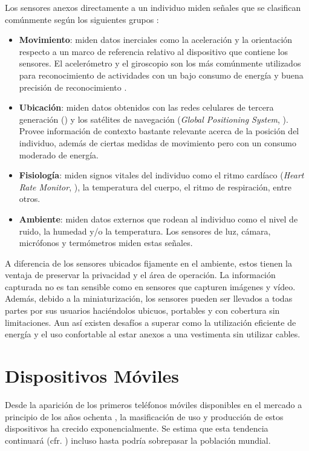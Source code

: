 Los sensores anexos directamente a un individuo miden señales que
se clasifican comúnmente según los siguientes grupos \cite{LaraLabrador2013}:
\begin{itemize}
\item \textbf{Movimiento}: miden datos inerciales como la aceleración y
la orientación respecto a un marco de referencia relativo al dispositivo
que contiene los sensores. El acelerómetro y el giroscopio son los
más comúnmente utilizados para reconocimiento de actividades con un
bajo consumo de energía y buena precisión de reconocimiento \cite{Bao2004,LaraLabrador2012}.
\item \textbf{Ubicación}: miden datos obtenidos con las redes celulares
de tercera generación () y los satélites de navegación (\emph{Global
Positioning System}, ). Provee información de contexto
bastante relevante acerca de la posición del individuo, además de
ciertas medidas de movimiento pero con un consumo moderado de energía.
\item \textbf{Fisiología}: miden signos vitales del individuo como el ritmo
cardíaco (\emph{Heart Rate Monitor},\emph{ }), la temperatura
del cuerpo, el ritmo de respiración, entre otros.
\item \textbf{Ambiente}: miden datos externos que rodean al individuo como
el nivel de ruido, la humedad y/o la temperatura. Los sensores de
luz, cámara, micrófonos y termómetros miden estas señales. 
\end{itemize}
A diferencia de los sensores ubicados fijamente en el ambiente, estos
tienen la ventaja de preservar la privacidad y el área de operación.
La información capturada no es tan sensible como en sensores que capturen
imágenes y vídeo. Además, debido a la miniaturización, los sensores
pueden ser llevados a todas partes por sus usuarios haciéndolos ubicuos,
portables y con cobertura sin limitaciones. Aun así existen desafíos
a superar como la utilización eficiente de energía y el uso confortable
al estar anexos a una vestimenta sin utilizar cables.

\section{Dispositivos Móviles}

\label{sec24:dispositivos-moviles} Desde la aparición de los primeros
teléfonos móviles disponibles en el mercado a principio de los años
ochenta \cite{Tanenbaum2010}, la masificación de uso y producción
de estos dispositivos ha crecido exponencialmente. Se estima que esta
tendencia continuará (cfr. \cite{Ekholm2011}) incluso hasta podría
sobrepasar la población mundial.

